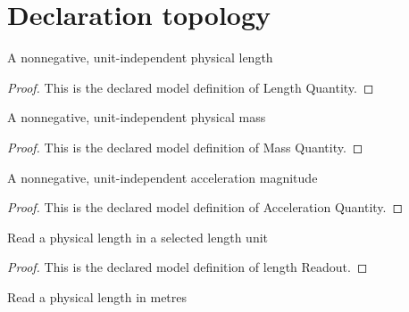 \section{Declaration topology}
\begin{definition}
  \label{def:physics:phyx-mini-0715:phyxminiproblems-problemphyxmini0715-lengthquantity}
  A nonnegative, unit-independent physical length
\end{definition}
\begin{proof}
  This is the declared model definition of Length Quantity.
\end{proof}
\begin{definition}
  \label{def:physics:phyx-mini-0715:phyxminiproblems-problemphyxmini0715-massquantity}
  A nonnegative, unit-independent physical mass
\end{definition}
\begin{proof}
  This is the declared model definition of Mass Quantity.
\end{proof}
\begin{definition}
  \label{def:physics:phyx-mini-0715:phyxminiproblems-problemphyxmini0715-accelerationquantity}
  A nonnegative, unit-independent acceleration magnitude
\end{definition}
\begin{proof}
  This is the declared model definition of Acceleration Quantity.
\end{proof}
\begin{definition}
  \label{def:physics:phyx-mini-0715:phyxminiproblems-problemphyxmini0715-lengthreadout}
  Read a physical length in a selected length unit
\end{definition}
\begin{proof}
  This is the declared model definition of length Readout.
\end{proof}
\begin{definition}
  \label{def:physics:phyx-mini-0715:phyxminiproblems-problemphyxmini0715-lengthinmeters}
  Read a physical length in metres
\end{definition}
